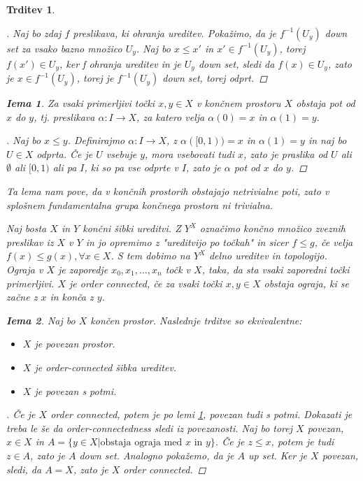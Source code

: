\documentclass[a4paper,12pt]{article}
\theoremstyle{definition}
\theoremstyle{plain}
\theoremstyle{definition}
\theoremstyle{plain}
\newtheorem{trditev}{Trditev}
\theoremstyle{plain}
\theoremstyle{plain}
\theoremstyle{plain}
\newtheorem{lema}{Iema}
\newenvironment{dokaz}{\begin{proof}[\bfseries\upshape\proofname]}{\end{proof}}
\begin{document}
\begin{trditev}
\begin{dokaz}
    Naj bo zdaj $f$ preslikava, ki ohranja ureditev. Pokažimo, da je $f^{-1}(U_y)$ down set za vsako bazno množico $U_y$. Naj bo $x\leq x'$ in $x'\in f^{-1}(U_y)$, torej $f(x') \in U_y$, ker f ohranja ureditev in je $U_y$ down set, sledi da $f(x)\in U_y$, zato je $x\in f^{-1}(U_y)$, torej je $f^{-1}(U_y)$ down set, torej odprt.


\end{dokaz}


\begin{lema}\label{lem:pot}
    Za vsaki primerljivi točki $x,y\in X$ v končnem prostoru $X$ obstaja pot od $x$ do $y$, tj. preslikava $\alpha: I \rightarrow X$, za katero velja $\alpha(0)=x$ in $\alpha(1)=y$.

\end{lema}
\begin{dokaz}
    Naj bo $x \leq y$. Definirajmo $\alpha:I\rightarrow X$, z $\alpha([0,1))=x$ in $\alpha(1)=y$ in naj bo $U\in X$ odprta. Če je $U$ vsebuje $y$, mora vsebovati tudi $x$, 
    zato je praslika od $U$ ali $\emptyset$ ali $[0,1)$ ali pa $I$, ki so pa vse odprte v $I$, zato je $\alpha$ pot od $x$ do $y$.
\end{dokaz}
Ta lema nam pove, da v končnih prostorih obstajajo netrivialne poti, zato v splošnem fundamentalna grupa končnega prostora ni trivialna.

Naj bosta $X$ in $Y$ končni šibki ureditvi. Z $Y^X$ označimo končno množico zveznih preslikav iz $X$ v $Y$ in jo opremimo z "ureditvijo po točkah" in sicer $f\leq g$, če velja $f(x) \leq g(x), \forall x\in X$. S tem dobimo na $Y^X$ delno ureditev in topologijo. \textit{Ograja} v $X$ je zaporedje $x_0,x_1,...,x_n$ točk v $X$, taka, da sta vsaki zaporedni točki primerljivi. $X$ je \textit{order 
connected}, če za vsaki točki $x,y\in X$ obstaja ograja, ki se začne z $x$ in konča z $y$.
\begin{lema}
    Naj bo $X$ končen prostor. Naslednje trditve so ekvivalentne:

    \begin{itemize}
        \label{lem:povezanost}
        \item $X$ je povezan prostor.
        \item $X$ je order-connected šibka ureditev.
        \item $X$ je povezan s potmi.
    \end{itemize}
\end{lema}


\begin{dokaz}
    Če je $X$ order connected, potem je po lemi \ref{lem:pot}, povezan tudi s potmi.
    Dokazati je treba le še da order-connectedness sledi iz povezanosti. Naj bo torej $X$ povezan, $x\in X$ in $A=\{y\in X| \text{obstaja ograja med $x$ in $y$}\}$. Če 
    je $z\leq x$, potem je tudi $z\in A$, zato je $A$ down set. Analogno pokažemo, da je $A$ up set. Ker je $X$ povezan, sledi, da $A=X$, zato je $X$ order connected.
\end{dokaz}


\end{trditev}
\end{document}
